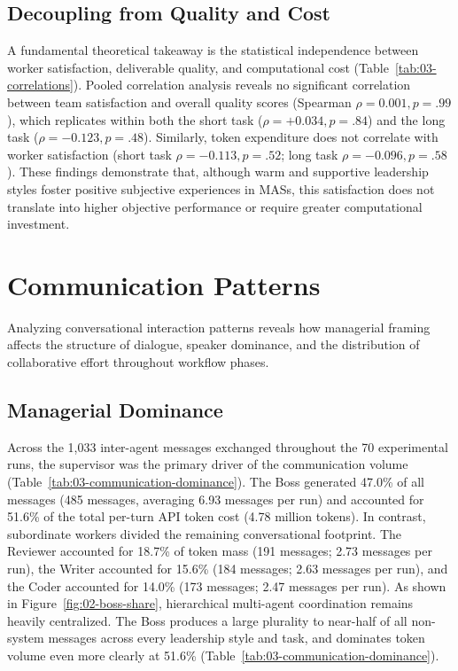 \subsection{Decoupling from Quality and Cost}
\label{subsec:decoupling-quality-cost}

A fundamental theoretical takeaway is the statistical independence between worker satisfaction, deliverable quality, and computational cost (Table~\ref{tab:03-correlations}).
Pooled correlation analysis reveals no significant correlation between team satisfaction and overall quality scores (Spearman $\rho = 0.001, p = .99$), which replicates within both the short task ($\rho = +0.034, p = .84$) and the long task ($\rho = -0.123, p = .48$).
Similarly, token expenditure does not correlate with worker satisfaction (short task $\rho = -0.113, p = .52$; long task $\rho = -0.096, p = .58$).
These findings demonstrate that, although warm and supportive leadership styles foster positive subjective experiences in \acp{MAS}, this satisfaction does not translate into higher objective performance or require greater computational investment.

\section{Communication Patterns}
\label{sec:communication-patterns}

Analyzing conversational interaction patterns reveals how managerial framing affects the structure of dialogue, speaker dominance, and the distribution of collaborative effort throughout workflow phases.

\subsection{Managerial Dominance}
\label{subsec:managerial-dominance}

Across the 1,033 inter-agent messages exchanged throughout the 70 experimental runs, the supervisor was the primary driver of the communication volume (Table~\ref{tab:03-communication-dominance}).
The Boss generated 47.0\% of all messages (485 messages, averaging 6.93 messages per run) and accounted for 51.6\% of the total per-turn \ac{API} token cost (4.78 million tokens).
In contrast, subordinate workers divided the remaining conversational footprint.
The Reviewer accounted for 18.7\% of token mass (191 messages; 2.73 messages per run),
the Writer accounted for 15.6\% (184 messages; 2.63 messages per run),
and the Coder accounted for 14.0\% (173 messages; 2.47 messages per run).
As shown in Figure~\ref{fig:02-boss-share}, hierarchical multi-agent coordination remains heavily centralized. 
The Boss produces a large plurality to near-half of all non-system messages across every leadership style and task, and dominates token volume even more clearly at 51.6\% (Table~\ref{tab:03-communication-dominance}).

